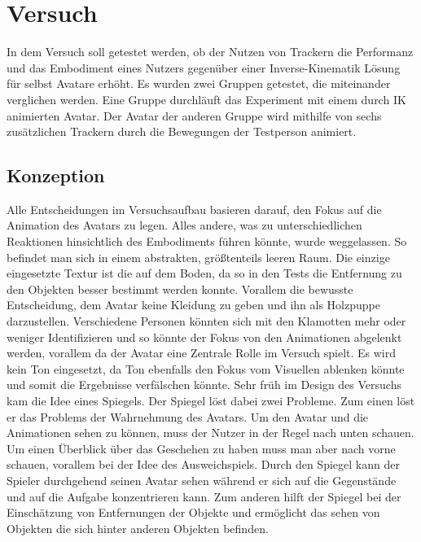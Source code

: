 \chapter{Versuch}
In dem Versuch soll getestet werden, ob der Nutzen von Trackern die Performanz und das Embodiment eines Nutzers gegenüber einer Inverse-Kinematik Lösung für selbst Avatare erhöht. Es wurden zwei Gruppen getestet, die miteinander verglichen werden. Eine Gruppe durchläuft das Experiment mit einem durch IK animierten Avatar. Der Avatar der anderen Gruppe wird mithilfe von sechs zusätzlichen Trackern durch die Bewegungen der Testperson animiert.


\section{Konzeption}
Alle Entscheidungen im Versuchsaufbau basieren darauf, den Fokus auf die Animation des Avatars zu legen. Alles andere, was zu unterschiedlichen Reaktionen hinsichtlich des Embodiments führen könnte, wurde weggelassen. So befindet man sich in einem abstrakten, größtenteils leeren Raum. Die einzige eingesetzte Textur ist die auf dem Boden, da so in den Tests die Entfernung zu den Objekten besser bestimmt werden konnte. Vorallem die bewusste Entscheidung, dem Avatar keine Kleidung zu geben und ihn als Holzpuppe darzustellen. Verschiedene Personen könnten sich mit den Klamotten mehr oder weniger Identifizieren und so könnte der Fokus von den Animationen abgelenkt werden, vorallem da der Avatar eine Zentrale Rolle im Versuch spielt.
Es wird kein Ton eingesetzt, da Ton ebenfalls den Fokus vom Visuellen ablenken könnte und somit die Ergebnisse verfälschen könnte.
Sehr früh im Design des Versuchs kam die Idee eines Spiegels. Der Spiegel löst dabei zwei Probleme. Zum einen löst er das Problems der Wahrnehmung des Avatars. Um den Avatar und die Animationen sehen zu können, muss der Nutzer in der Regel nach unten schauen. Um einen Überblick über das Geschehen zu haben muss man aber nach vorne schauen, vorallem bei der Idee des Ausweichspiels. Durch den Spiegel kann der Spieler durchgehend seinen Avatar sehen während er sich auf die Gegenstände und auf die Aufgabe konzentrieren kann. Zum anderen hilft der Spiegel bei der Einschätzung von Entfernungen der Objekte und ermöglicht das sehen von Objekten die sich hinter anderen Objekten befinden.

